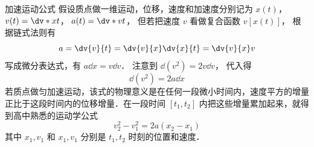 \begin{example}{加速运动公式}\label{ChainR_ex3}
假设质点做一维运动，位移，速度和加速度分别记为 $x(t)$，  $v(t) = \dv*{x}{t}$，  $a(t) = \dv*{v}{t}$， 但若把速度 $v$ 看做复合函数 $v[x(t)]$， 根据链式法则有
\begin{equation}
a = \dv{v}{t} = \dv{v}{x}\dv{x}{t} = \dv{v}{x}v
\end{equation}
写成微分表达式，有 $a\dd{x} = v\dd{v}$． 注意到 $\dd (v^2) = 2v\dd{v}$， 代入得
\begin{equation}
\dd(v^2) = 2a \dd{x}
\end{equation}
若质点做匀加速运动，该式的物理意义是在任何一段微小时间内，速度平方的增量正比于这段时间内的位移增量．在一段时间 $[t_1,t_2]$ 内把这些增量累加起来，就得到高中熟悉的运动学公式
\begin{equation}
v_2^2-v_1^2 = 2a(x_2-x_1)
\end{equation}
其中 $x_1,v_1$ 和 $x_1,v_1$ 分别是 $t_1,t_2$ 时刻的位置和速度．
\end{example}
